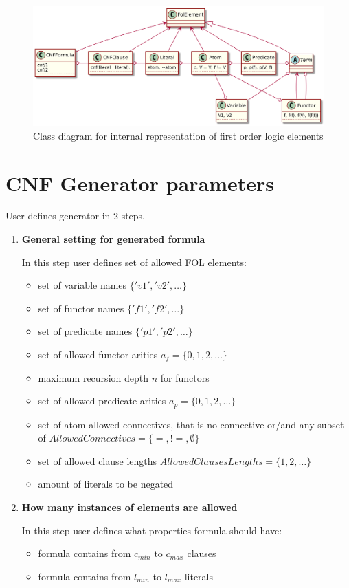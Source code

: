 \begin{figure}[h]
\begin{centering}
  \includegraphics[width=\textwidth]{logic-formula-generator/fol/cnf_fol_elements.png}
  \caption{Class diagram for internal representation of first order logic elements}
  \label{pic:fol_elements_class_diagram}
\end{centering}
\end{figure}

\section{CNF Generator parameters}

User defines generator in 2 steps.
\begin{enumerate}
  \item \textbf{General setting for generated formula}

    In this step user defines set of allowed \gls{FOL} elements:
    \begin{itemize}
      \item set of variable names $\{'v1','v2',\dots\}$
      \item set of functor names $\{'f1','f2',\dots\}$
      \item set of predicate names $\{'p1','p2',\dots\}$
      \item set of allowed functor arities $a_f = \{0, 1, 2,\dots\}$
      \item maximum recursion depth $n$ for functors
      \item set of allowed predicate arities $a_p = \{0, 1, 2,\dots\}$
      \item set of atom allowed connectives, that is no connective or/and any subset of $AllowedConnectives = \{=, !=, \emptyset\}$
      \item set of allowed clause lengths $AllowedClausesLengths = \{1,2,\dots\}$
      \item amount of literals to be negated
    \end{itemize}

  \item \textbf{How many instances of elements are allowed}

    In this step user defines what properties formula should have:
    \begin{itemize}
      \item formula contains from $c_{min}$ to $c_{max}$ clauses
      \item formula contains from $l_{min}$ to $l_{max}$ literals
    \end{itemize}

\end{enumerate}

